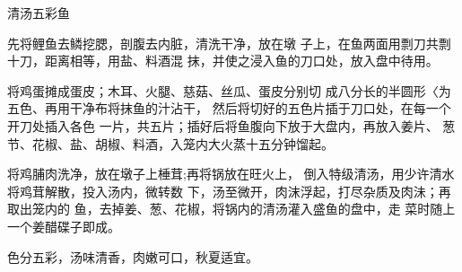 \begin{recipe}[麒麟鱼]{清汤五彩鱼}

\ingredients


\cooking

\step 先将鲤鱼去鳞挖腮，剖腹去内脏，清洗干净，放在墩 子上，在鱼两面用剽刀共剽十刀，距离相等，用盐、料酒混 抹，并使之浸入鱼的刀口处，放入盘中待用。

\step 将鸡蛋摊成蛋皮；木耳、火腿、慈菇、丝瓜、蛋皮分别切 成八分长的半圆形〈为五色、再用干净布将抹鱼的汁沾干， 然后将切好的五色片插于刀口处，在每一个开刀处插入各色 一片，共五片；插好后将鱼腹向下放于大盘内，再放入姜片、 葱节、花椒、盐、胡椒、料酒，入笼内大火蒸十五分钟馏起。

将鸡脯肉洗净，放在墩子上棰茸;再将锅放在旺火上， 倒入特级清汤，用少许清水将鸡茸解散，投入汤内，微转数 下，汤至微开，肉沫浮起，打尽杂质及肉沬；再取出笼内的 鱼，去掉姜、葱、花椒，将锅内的清汤灌入盛鱼的盘中，走 菜时随上一个姜醋碟子即成。

\notes

色分五彩，汤味清香，肉嫩可口，秋夏适宜。

\end{recipe}

